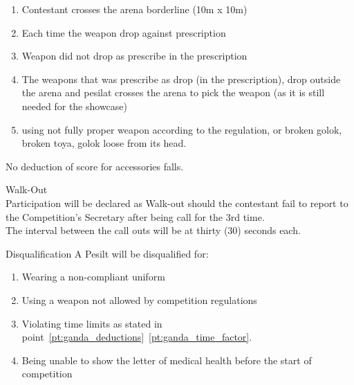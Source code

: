 \begin{legal}
\begin{legal}
\begin{legal}
\begin{enumerate}[label=\alph*.]
\begin{enumerate}[label*=\arabic*.]
                    \begin{enumerate}[label=\roman*.]
                    \item Contestant crosses the arena borderline (10m x 10m)
                    \item Each time the weapon drop against prescription
                    \item Weapon did not drop as prescribe in the prescription
                    \item The weapons that was prescribe as drop (in the prescription), drop outside
                        the arena and pesilat crosses the arena to pick the weapon (as it is still needed
                        for the showcase)
                    \item using not fully proper weapon according to the regulation, or broken golok,
                        broken toya, golok loose from its head.
                    \end{enumerate}
                
                \end{enumerate}
            No deduction of score for accessories falls.
            \end{enumerate}
        \item Walk-Out \\
        Participation will be declared as Walk-out should the contestant fail to report to the Competition’s 
        Secretary after being call for the 3rd time.\\

        The interval between the call outs will be at thirty (30) seconds each.

        \item Disqualification
            A Pesilt will be disqualified for:
            \begin{enumerate}[label=\alph*.]
            \item Wearing a non-compliant uniform 
            \item Using a weapon not allowed by competition regulations 
            \item Violating time limits as stated in point~\ref{pt:ganda_deductions}~\ref{pt:ganda_time_factor}.
            \item Being unable to show the letter of medical health before the start of competition 
            \end{enumerate}

        \end{legal}


\end{legal}
\end{legal}
